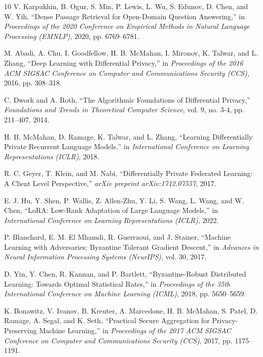 \documentclass[acmsmall,screen]{acmart}
\begin{document}
\begin{thebibliography}{10}
V. Karpukhin, B. Oguz, S. Min, P. Lewis, L. Wu, S. Edunov, D. Chen, and W. Yih,
``Dense Passage Retrieval for Open-Domain Question Answering,''
in \textit{Proceedings of the 2020 Conference on Empirical Methods in Natural Language Processing (EMNLP)}, 2020, pp. 6769--6781.

M. Abadi, A. Chu, I. Goodfellow, H. B. McMahan, I. Mironov, K. Talwar, and L. Zhang,
``Deep Learning with Differential Privacy,''
in \textit{Proceedings of the 2016 ACM SIGSAC Conference on Computer and Communications Security (CCS)}, 2016, pp. 308--318.

C. Dwork and A. Roth,
``The Algorithmic Foundations of Differential Privacy,''
\textit{Foundations and Trends in Theoretical Computer Science}, vol. 9, no. 3-4, pp. 211--407, 2014.

H. B. McMahan, D. Ramage, K. Talwar, and L. Zhang,
``Learning Differentially Private Recurrent Language Models,''
in \textit{International Conference on Learning Representations (ICLR)}, 2018.

R. C. Geyer, T. Klein, and M. Nabi,
``Differentially Private Federated Learning: A Client Level Perspective,''
\textit{arXiv preprint arXiv:1712.07557}, 2017.

E. J. Hu, Y. Shen, P. Wallis, Z. Allen-Zhu, Y. Li, S. Wang, L. Wang, and W. Chen,
``LoRA: Low-Rank Adaptation of Large Language Models,''
in \textit{International Conference on Learning Representations (ICLR)}, 2022.

P. Blanchard, E. M. El Mhamdi, R. Guerraoui, and J. Stainer,
``Machine Learning with Adversaries: Byzantine Tolerant Gradient Descent,''
in \textit{Advances in Neural Information Processing Systems (NeurIPS)}, vol. 30, 2017.

D. Yin, Y. Chen, R. Kannan, and P. Bartlett,
``Byzantine-Robust Distributed Learning: Towards Optimal Statistical Rates,''
in \textit{Proceedings of the 35th International Conference on Machine Learning (ICML)}, 2018, pp. 5650--5659.

K. Bonawitz, V. Ivanov, B. Kreuter, A. Marcedone, H. B. McMahan, S. Patel, D. Ramage, A. Segal, and K. Seth,
``Practical Secure Aggregation for Privacy-Preserving Machine Learning,''
in \textit{Proceedings of the 2017 ACM SIGSAC Conference on Computer and Communications Security (CCS)}, 2017, pp. 1175--1191.

\end{thebibliography}
\end{document}
